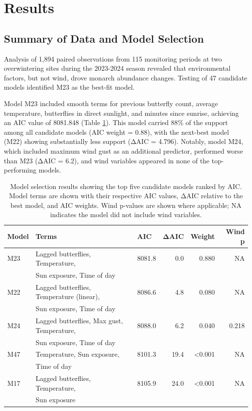 \section{Results}

\subsection{Summary of Data and Model Selection}

Analysis of 1,894 paired observations from 115 monitoring periods at two overwintering sites during the 2023-2024 season revealed that environmental factors, but not wind, drove monarch abundance changes. Testing of 47 candidate models identified M23 as the best-fit model.

Model M23 included smooth terms for previous butterfly count, average temperature, butterflies in direct sunlight, and minutes since sunrise, achieving an AIC value of 8081.848 (Table \ref{tab:model_selection}). This model carried 88\% of the support among all candidate models (AIC weight = 0.88), with the next-best model (M22) showing substantially less support (ΔAIC = 4.796). Notably, model M24, which included maximum wind gust as an additional predictor, performed worse than M23 (ΔAIC = 6.2), and wind variables appeared in none of the top-performing models.

\begin{table}[htbp]
\centering
\caption{Model selection results showing the top five candidate models ranked by AIC. Model terms are shown with their respective AIC values, ΔAIC relative to the best model, and AIC weights. Wind p-values are shown where applicable; NA indicates the model did not include wind variables.}
\label{tab:model_selection}
\begin{tabular}{lllrrr}
\hline
Model & Terms & AIC & ΔAIC & Weight & Wind p \\
\hline
M23 & Lagged butterflies, Temperature, & 8081.8 & 0.0 & 0.880 & NA \\
    & Sun exposure, Time of day & & & & \\
M22 & Lagged butterflies, Temperature (linear), & 8086.6 & 4.8 & 0.080 & NA \\
    & Sun exposure, Time of day & & & & \\
M24 & Lagged butterflies, Max gust, Temperature, & 8088.0 & 6.2 & 0.040 & 0.218 \\
    & Sun exposure, Time of day & & & & \\
M47 & Temperature, Sun exposure, & 8101.3 & 19.4 & <0.001 & NA \\
    & Time of day & & & & \\
M17 & Lagged butterflies, Temperature, & 8105.9 & 24.0 & <0.001 & NA \\
    & Sun exposure & & & & \\
\hline
\end{tabular}
\end{table}

